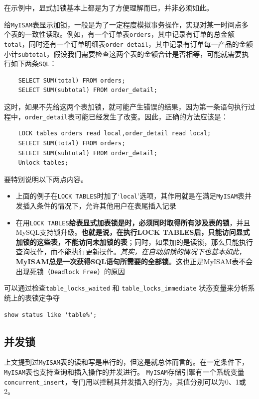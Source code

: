 \documentclass[UTF8,a4paper,12pt]{ctexbook}
\begin{document}
			在示例中，显式加锁基本上都是为了方便理解而已，并非必须如此。
			
			给\verb|MyISAM|表显示加锁，一般是为了一定程度模拟事务操作，实现对某一时间点多个表的一致性读取。例如，有一个订单表\verb|orders|，其中记录有订单的总金额\verb|total|，同时还有一个订单明细表\verb|order_detail|，其中记录有订单每一产品的金额小计\verb|subtotal|，假设我们需要检查这两个表的金额合计是否相等，可能就需要执行如下两条\verb|SQL|：
			
			\begin{lstlisting}
	SELECT SUM(total) FROM orders;
	SELECT SUM(subtotal) FROM order_detail;
			\end{lstlisting}
			
			这时，如果不先给这两个表加锁，就可能产生错误的结果，因为第一条语句执行过程中，\verb|order_detail|表可能已经发生了改变。因此，正确的方法应该是：
			
			\begin{lstlisting}
	LOCK tables orders read local,order_detail read local;
	SELECT SUM(total) FROM orders;
	SELECT SUM(subtotal) FROM order_detail;
	Unlock tables;	
			\end{lstlisting}
			
			要特别说明以下两点内容。
			
			\begin{itemize}
				\item 上面的例子在\verb|LOCK TABLES|时加了‘\verb|local|’选项，其作用就是在满足\verb|MyISAM|表并发插入条件的情况下，允许其他用户在表尾插入记录
				\item 在用\verb|LOCK TABLES|\textbf{给表显式加表锁是时，必须同时取得所有涉及表的锁}，并且MySQL支持锁升级。\textbf{也就是说，在执行LOCK TABLES后，只能访问显式加锁的这些表，不能访问未加锁的表}；同时，如果加的是读锁，那么只能执行查询操作，而不能执行更新操作。\textit{其实，在自动加锁的情况下也基本如此}，\textbf{MyISAM总是一次获得SQL语句所需要的全部锁}。这也正是MyISAM表不会出现死锁（\verb|Deadlock Free|）的原因
			\end{itemize}
			
			可以通过检查\verb|table_locks_waited| 和 \verb|table_locks_immediate| 状态变量来分析系统上的表锁定争夺
			
			\verb|show status like 'table%';|
			
		\subsection{并发锁}
			上文提到过\verb|MyISAM|表的读和写是串行的，但这是就总体而言的。在一定条件下，\verb|MyISAM|表也支持查询和插入操作的并发进行。 \verb|MyISAM|存储引擎有一个系统变量\verb|concurrent_insert|，专门用以控制其并发插入的行为，其值分别可以为0、1或2。
			
\end{document}
